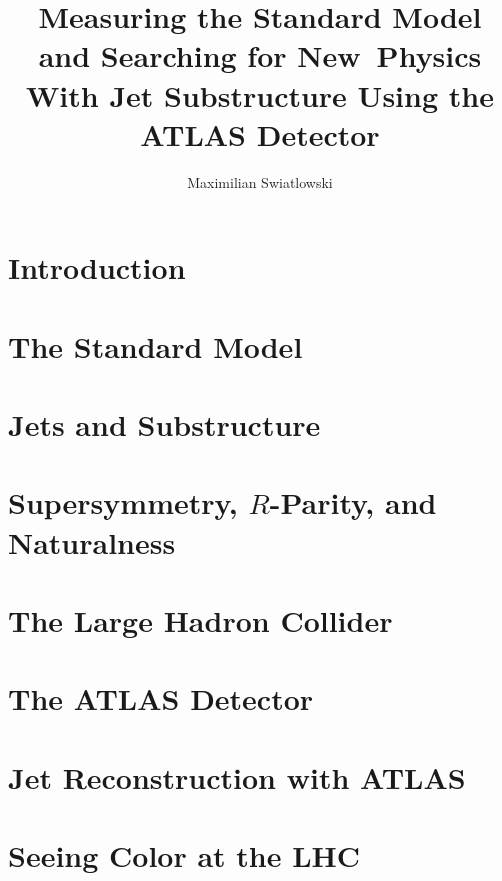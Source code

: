 \documentclass{report}
\begin{document}
\title{Measuring the Standard Model and Searching for New~Physics 
        With Jet Substructure Using the ATLAS Detector}
\author{Maximilian Swiatlowski}

 
\beforepreface
{}


\afterpreface
 
\chapter{Introduction}


\chapter{The Standard Model}



\chapter{Jets and Substructure}


\chapter{Supersymmetry, $R$-Parity, and Naturalness}



\chapter{The Large Hadron Collider}

		

\chapter{The ATLAS Detector}



\chapter{Jet Reconstruction with ATLAS}


\chapter{Seeing Color at the LHC}

\end{document}
